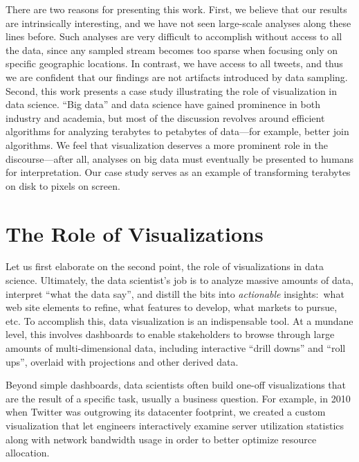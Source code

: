\documentclass[letterpaper]{article}
\begin{document}
There are two reasons for presenting this work. First, we believe that our
results are intrinsically interesting, and we have not seen
large-scale analyses along these lines before. Such analyses are very
difficult to accomplish without access to all the data, since
any sampled stream becomes too sparse when focusing only on specific
geographic locations. In contrast, we have access to all tweets,
and thus we are confident that our findings are not artifacts
introduced by data sampling. Second, this work presents a case study
illustrating the role of visualization in data science. ``Big data''
and data science have gained prominence in both industry and academia,
but most of the discussion revolves around efficient algorithms for analyzing
terabytes to petabytes of data---for example, better join
algorithms. We feel that visualization deserves a more prominent role
in the discourse---after all, analyses on big data must
eventually be presented to humans for interpretation. Our case study
serves as an example of transforming terabytes on disk to pixels on screen.

\section{The Role of Visualizations}

Let us first elaborate on the second point, the role of
visualizations in data science. Ultimately, the data scientist's job
is to analyze massive amounts of data, interpret ``what the data
say'', and distill the bits into {\it actionable} insights:\ 
what web site elements to refine, what
features to develop, what markets to pursue, etc. To accomplish this,
data visualization is an indispensable tool. At a mundane level,
this involves dashboards to enable stakeholders to browse through
large amounts of multi-dimensional data, including interactive ``drill
downs'' and ``roll ups'', overlaid with projections and other derived
data. 


Beyond simple dashboards, data scientists often build one-off
visualizations that are the result of a specific task, usually a
business question. For example, in 2010 when Twitter was outgrowing
its datacenter footprint, we created a custom visualization that let
engineers interactively examine server utilization statistics along
with network bandwidth usage in order to better optimize resource
allocation.
\end{document}
